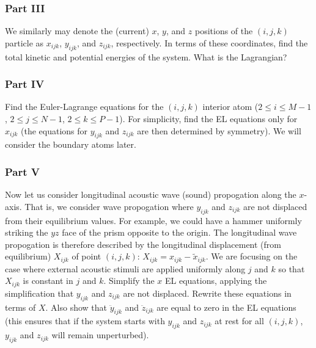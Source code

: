 \documentclass[letterpaper,12pt]{article}
\begin{document}
\begin{flushleft}
    \subsubsection*{Part III}
    We similarly may denote the (current) $x$, $y$, and $z$ positions of the $(i, j, k)$ particle as $x_{ijk}$, $y_{ijk}$, and $z_{ijk}$, respectively. In terms of these coordinates, find the total kinetic and potential energies of the system. What is the Lagrangian?

    \subsubsection*{Part IV}
    Find the Euler-Lagrange equations for the $(i, j, k)$ interior atom ($2 \leq i \leq M-1$, $2 \leq j \leq N-1$, $2 \leq k \leq P-1$). For simplicity, find the EL equations only for $x_{ijk}$ (the equations for $y_{ijk}$ and $z_{ijk}$ are then determined by symmetry). We will consider the boundary atoms later.

    \subsubsection*{Part V}
    Now let us consider longitudinal acoustic wave (sound) propogation along the $x$-axis. That is, we consider wave propogation where $y_{ijk}$ and $z_{ijk}$ are not displaced from their equilibrium values. For example, we could have a hammer uniformly striking the $yz$ face of the prism opposite to the origin. The longitudinal wave propogation is therefore described by the longitudinal displacement (from equilibrium) $X_{ijk}$ of point $(i, j, k)$: $X_{ijk} = x_{ijk} - \tilde{x}_{ijk}$. We are focusing on the case where external acoustic stimuli are applied uniformly along $j$ and $k$ so that $X_{ijk}$ is constant in $j$ and $k$.\newline\newline
    Simplify the $x$ EL equations, applying the simplification that $y_{ijk}$ and $z_{ijk}$ are not displaced. Rewrite these equations in terms of $X$. Also show that $\ddot{y}_{ijk}$ and $\ddot{z}_{ijk}$ are equal to zero in the EL equations (this ensures that if the system starts with $y_{ijk}$ and $z_{ijk}$ at rest for all $(i, j, k)$, $y_{ijk}$ and $z_{ijk}$ will remain unperturbed).


\end{flushleft}
\end{document}
